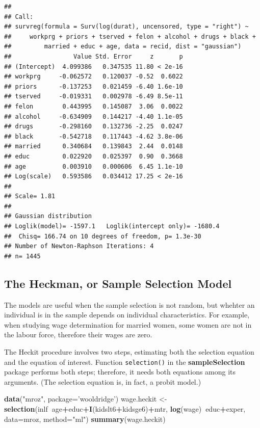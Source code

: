 \documentclass[]{book}
\newenvironment{Shaded}{\begin{snugshade}}{\end{snugshade}}
\newcommand{\DataTypeTok}[1]{\textcolor[rgb]{0.13,0.29,0.53}{#1}}
\newcommand{\KeywordTok}[1]{\textcolor[rgb]{0.13,0.29,0.53}{\textbf{#1}}}
\newcommand{\NormalTok}[1]{#1}
\newcommand{\OperatorTok}[1]{\textcolor[rgb]{0.81,0.36,0.00}{\textbf{#1}}}
\newcommand{\StringTok}[1]{\textcolor[rgb]{0.31,0.60,0.02}{#1}}
\begin{document}
\begin{verbatim}
## 
## Call:
## survreg(formula = Surv(log(durat), uncensored, type = "right") ~ 
##     workprg + priors + tserved + felon + alcohol + drugs + black + 
##         married + educ + age, data = recid, dist = "gaussian")
##                 Value Std. Error     z       p
## (Intercept)  4.099386   0.347535 11.80 < 2e-16
## workprg     -0.062572   0.120037 -0.52  0.6022
## priors      -0.137253   0.021459 -6.40 1.6e-10
## tserved     -0.019331   0.002978 -6.49 8.5e-11
## felon        0.443995   0.145087  3.06  0.0022
## alcohol     -0.634909   0.144217 -4.40 1.1e-05
## drugs       -0.298160   0.132736 -2.25  0.0247
## black       -0.542718   0.117443 -4.62 3.8e-06
## married      0.340684   0.139843  2.44  0.0148
## educ         0.022920   0.025397  0.90  0.3668
## age          0.003910   0.000606  6.45 1.1e-10
## Log(scale)   0.593586   0.034412 17.25 < 2e-16
## 
## Scale= 1.81 
## 
## Gaussian distribution
## Loglik(model)= -1597.1   Loglik(intercept only)= -1680.4
##  Chisq= 166.74 on 10 degrees of freedom, p= 1.3e-30 
## Number of Newton-Raphson Iterations: 4 
## n= 1445
\end{verbatim}

\hypertarget{the-heckman-or-sample-selection-model}{%
\subsection{The Heckman, or Sample Selection Model}\label{the-heckman-or-sample-selection-model}}

The models are useful when the sample selection is not random, but whehter an individual is in the sample depends on individual characteristics. For example, when studying wage determination for married women, some women are not in the labour force, therefore their wages are zero.

The Heckit procedure involves two steps, estimating both the selection equation and the equation of interest. Function \texttt{selection()} in the \textbf{sampleSelection} package performs both steps; therefore, it needs both equations among its arguments. (The selection equation is, in fact, a probit model.)

\begin{Shaded}
\begin{Highlighting}[]
\KeywordTok{data}\NormalTok{(}\StringTok{"mroz"}\NormalTok{, }\DataTypeTok{package=}\StringTok{'wooldridge'}\NormalTok{)}
\NormalTok{wage.heckit <-}\StringTok{ }\KeywordTok{selection}\NormalTok{(inlf}\OperatorTok{~}\NormalTok{age}\OperatorTok{+}\NormalTok{educ}\OperatorTok{+}\KeywordTok{I}\NormalTok{(kidslt6}\OperatorTok{+}\NormalTok{kidsge6)}\OperatorTok{+}\NormalTok{mtr,}
                         \KeywordTok{log}\NormalTok{(wage)}\OperatorTok{~}\NormalTok{educ}\OperatorTok{+}\NormalTok{exper, }
                         \DataTypeTok{data=}\NormalTok{mroz, }\DataTypeTok{method=}\StringTok{"ml"}\NormalTok{)}
\KeywordTok{summary}\NormalTok{(wage.heckit)}
\end{Highlighting}
\end{Shaded}
\end{document}
